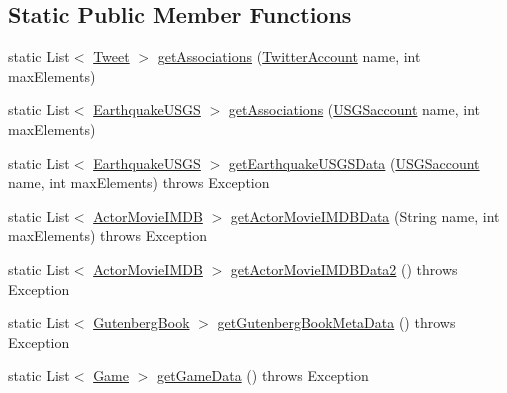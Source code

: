 \subsection*{Static Public Member Functions}
\begin{DoxyCompactItemize}
\item 
static List$<$ \hyperlink{classbridges_1_1data__src__dependent_1_1_tweet}{Tweet} $>$ \hyperlink{classbridges_1_1connect_1_1_bridges_ad8f145f95222730fad3c0628b42f0128}{get\+Associations} (\hyperlink{classbridges_1_1data__src__dependent_1_1_twitter_account}{Twitter\+Account} name, int max\+Elements)
\item 
static List$<$ \hyperlink{classbridges_1_1data__src__dependent_1_1_earthquake_u_s_g_s}{Earthquake\+U\+S\+GS} $>$ \hyperlink{classbridges_1_1connect_1_1_bridges_ac02211d6205c1270df11fcc271982d40}{get\+Associations} (\hyperlink{classbridges_1_1data__src__dependent_1_1_u_s_g_saccount}{U\+S\+G\+Saccount} name, int max\+Elements)
\item 
static List$<$ \hyperlink{classbridges_1_1data__src__dependent_1_1_earthquake_u_s_g_s}{Earthquake\+U\+S\+GS} $>$ \hyperlink{classbridges_1_1connect_1_1_bridges_afd68bf25a3f61e731f603da67fbdcecc}{get\+Earthquake\+U\+S\+G\+S\+Data} (\hyperlink{classbridges_1_1data__src__dependent_1_1_u_s_g_saccount}{U\+S\+G\+Saccount} name, int max\+Elements)  throws Exception 
\item 
static List$<$ \hyperlink{classbridges_1_1data__src__dependent_1_1_actor_movie_i_m_d_b}{Actor\+Movie\+I\+M\+DB} $>$ \hyperlink{classbridges_1_1connect_1_1_bridges_a30338703da622d677b9ac4f83f8d4200}{get\+Actor\+Movie\+I\+M\+D\+B\+Data} (String name, int max\+Elements)  throws Exception 
\item 
static List$<$ \hyperlink{classbridges_1_1data__src__dependent_1_1_actor_movie_i_m_d_b}{Actor\+Movie\+I\+M\+DB} $>$ \hyperlink{classbridges_1_1connect_1_1_bridges_a02031d2a33b708588774473d36ba35c2}{get\+Actor\+Movie\+I\+M\+D\+B\+Data2} ()  throws Exception 
\item 
static List$<$ \hyperlink{classbridges_1_1data__src__dependent_1_1_gutenberg_book}{Gutenberg\+Book} $>$ \hyperlink{classbridges_1_1connect_1_1_bridges_a123d445316be7e9927b5642a3b8c71ba}{get\+Gutenberg\+Book\+Meta\+Data} ()  throws Exception
\item 
static List$<$ \hyperlink{classbridges_1_1data__src__dependent_1_1_game}{Game} $>$ \hyperlink{classbridges_1_1connect_1_1_bridges_abcd1c3465d8963cd635a63e248f33525}{get\+Game\+Data} ()  throws Exception 
\item 

\end{DoxyCompactItemize}
